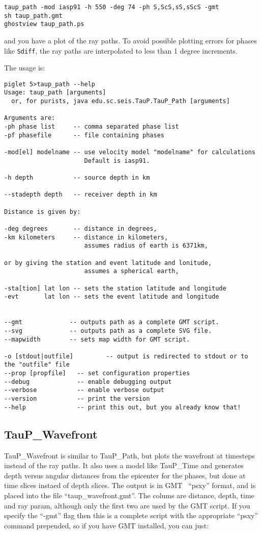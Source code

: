 \begin{verbatim}
taup_path -mod iasp91 -h 550 -deg 74 -ph S,ScS,sS,sScS -gmt
sh taup_path.gmt
ghostview taup_path.ps
\end{verbatim}

and you have a plot of the ray paths. To avoid possible plotting errors for
phases like \texttt{Sdiff}, the ray paths are interpolated to less than 
1 degree increments.

The usage is:
\begin{verbatim}
piglet 5>taup_path --help
Usage: taup_path [arguments]
  or, for purists, java edu.sc.seis.TauP.TauP_Path [arguments]

Arguments are:
-ph phase list     -- comma separated phase list
-pf phasefile      -- file containing phases

-mod[el] modelname -- use velocity model "modelname" for calculations
                      Default is iasp91.

-h depth           -- source depth in km

--stadepth depth   -- receiver depth in km

Distance is given by:

-deg degrees       -- distance in degrees,
-km kilometers     -- distance in kilometers,
                      assumes radius of earth is 6371km,

or by giving the station and event latitude and lonitude,
                      assumes a spherical earth,

-sta[tion] lat lon -- sets the station latitude and longitude
-evt       lat lon -- sets the event latitude and longitude


--gmt             -- outputs path as a complete GMT script.
--svg             -- outputs path as a complete SVG file.
--mapwidth        -- sets map width for GMT script.

-o [stdout|outfile]         -- output is redirected to stdout or to the "outfile" file
--prop [propfile]   -- set configuration properties
--debug             -- enable debugging output
--verbose           -- enable verbose output
--version           -- print the version
--help              -- print this out, but you already know that!
\end{verbatim} 

\subsection{TauP\_Wavefront}
TauP\_Wavefront is similar to TauP\_Path, but plots the wavefront at timesteps instead of the
ray paths. It also uses a model like TauP\_Time and
generates  depth versus
angular distances from the epicenter for the phases, but done at time slices instaed of depth slices. 
The output is in GMT~\cite{GMT} ``psxy'' format, and is
placed into the file ``taup\_wavefront.gmt''. 
The colums are distance, depth, time and ray param, although only the first two are used by the GMT script.
If you specify the ``-gmt'' flag then this 
is a complete script with the appropriate ``psxy'' command prepended, so if you
have GMT installed, you can just:

